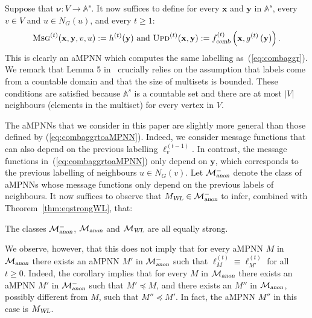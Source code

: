 Suppose that
$\pmb{\nu}:V\to\mathbb{A}^s$. It now suffices to define for every $\mathbf{x}$ and $\mathbf{y}$ in $\mathbb{A}^s$, every $v\in V$ and $u\in N_G(u)$, and every $t\geq 1$:
\begin{equation}
\textsc{Msg}^{(t)}(\mathbf{x},\mathbf{y},v,u):=h^{(t)}(\mathbf{y}) \text{ and } \textsc{Upd}^{(t)}(\mathbf{x},\mathbf{y}):=f_{\textsl{comb}}^{(t)}\left(\mathbf{x},g^{(t)}\left(\mathbf{y}\right)\right).\label{eq:combaggrtoaMPNN}
\end{equation}
This is clearly an aMPNN which computes the same labelling as~(\ref{eq:combaggr}). We remark that
Lemma 5 in~\cite{xhlj19} crucially relies on the assumption that labels come from a countable domain
and that the size of multisets is bounded. These conditions are satisfied because $\mathbb{A}^s$ is a countable set and there are at most $|V|$ neighbours (elements in the multiset) for every vertex in $V$.

The aMPNNs that we consider in this paper are slightly more general than those defined by
(\ref{eq:combaggrtoaMPNN}). Indeed, we consider message functions that can also depend on the previous labelling $\pmb{\ell}_v^{(t-1)}$. In contrast, the message functions in~(\ref{eq:combaggrtoaMPNN}) only depend on $\mathbf{y}$, which corresponds to the previous labelling of neighbours $u\in N_G(v)$. Let $\mathcal{M}{}^{-}_{\textsl{anon}}$ denote the class of aMPNNs whose message functions only
depend on the previous labels of neighbours. It now suffices to observe that
 $M_{\textsl{WL}}\in \mathcal{M}{}^{-}_{\textsl{anon}}$ to infer,  combined with Theorem~\ref{thm:eqstrongWL}, that:
 \begin{corollary}
	 The classes $\mathcal{M}{}^{-}_{\textsl{anon}}$, $\mathcal{M}_{\textsl{anon}}$ and $\mathcal{M}_{\textsl{WL}}$ are all equally strong.
 \end{corollary}
We observe, however, that this does not imply that for every aMPNN $M$ in $\mathcal{M}_{\textsl{anon}}$ there exists an aMPNN $M'$ in $\mathcal{M}{}^{-}_{\textsl{anon}}$
such that $\pmb{\ell}_{M}^{(t)}\equiv \pmb{\ell}_{M'}^{(t)}$ for all $t\geq 0$.
Indeed, the corollary implies that for every $M$ in $\mathcal{M}_{\textsl{anon}}$ there exists an aMPNN $M'$ in $\mathcal{M}{}^{-}_{\textsl{anon}}$ such that $M'\preceq M$, and there exists an $M''$ in $\mathcal{M}_{\textsl{anon}}$, possibly different from $M$, such that $M''\preceq M'$. In fact, the aMPNN $M''$ in this case is $M_{\textsl{WL}}$.
